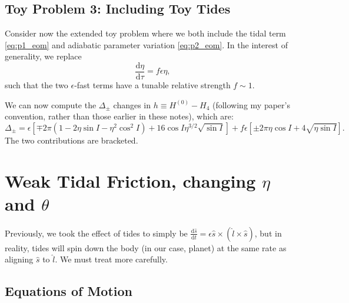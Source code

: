 \documentclass[11pt,
        usenames, %
        dvipsnames %
    ]{article}
\newcommand*{\rd}[2]{\frac{\mathrm{d}#1}{\mathrm{d}#2}}
\newcommand*{\p}[1]{\left(#1\right)}
\newcommand*{\s}[1]{\left[#1\right]}
\begin{document}
\subsection{Toy Problem 3: Including Toy Tides}

Consider now the extended toy problem where we both include the tidal term
\autoref{eq:p1_eom} and adiabatic parameter variation \autoref{eq:p2_eom}. In
the interest of generality, we replace
\begin{equation}
    \rd{\eta}{\tau} = f \epsilon \eta,
\end{equation}
such that the two $\epsilon$-fast terms have a tunable relative strength
$f \sim 1$.

We can now compute the $\Delta_{\pm}$ changes in $h \equiv H^{(0)} - H_4$
(following my paper's convention, rather than those earlier in these notes),
which are:
\begin{equation}
    \Delta_{\pm} = \epsilon\s{\mp 2\pi \p{1 - 2\eta \sin I - \eta^2 \cos^2 I} +
        16\cos I\eta^{3/2}\sqrt{\sin I}} + f\epsilon
            \s{\pm 2\pi \eta \cos I + 4\sqrt{\eta \sin I}}.
\end{equation}
The two contributions are bracketed.

\section{Weak Tidal Friction, changing $\eta$ and $\theta$}

Previously, we took the effect of tides to simply be $\rd{\hat{s}}{t} = \epsilon
\hat{s} \times \p{\hat{l} \times \hat{s}}$, but in reality, tides will spin
down the body (in our case, planet) at the same rate as aligning $\hat{s}$ to
$\hat{l}$. We must treat more carefully.

\subsection{Equations of Motion}
\end{document}
